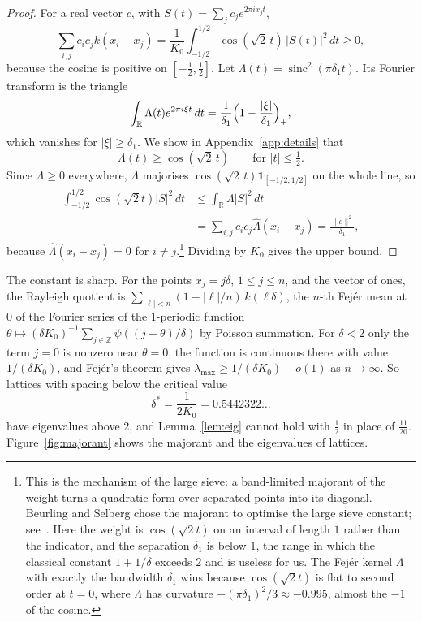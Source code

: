 \documentclass[aps,prd,twocolumn,superscriptaddress,nofootinbib,longbibliography,floatfix,showkeys,amsmath,amssymb,10pt]{revtex4-2}
\theoremstyle{definition}
\theoremstyle{remark}
\newcommand{\R}{\mathbb{R}}
\newcommand{\Z}{\mathbb{Z}}
\newcommand{\sinc}{\operatorname{sinc}}
\begin{document}
\begin{proof}
For a real vector $c$, with $S(t)=\sum_jc_je^{2\pi ix_jt}$,
\[
 \sum_{i,j}c_ic_jk(x_i-x_j)=\frac1{K_0}\int_{-1/2}^{1/2}\cos(\sqrt2\,t)
 \,|S(t)|^2\,dt\ge0,
\]
because the cosine is positive on $[-\frac12,\frac12]$. Let
$\Lambda(t)=\sinc^2(\pi\delta_1t)$. Its Fourier transform is the triangle
\[
 \int_\R\Lambda(t)e^{2\pi i\xi t}\,dt=\frac1{\delta_1}
 \Bigl(1-\frac{|\xi|}{\delta_1}\Bigr)_+,
\]
which vanishes for $|\xi|\ge\delta_1$. We show in Appendix~\ref{app:details}
that
\begin{equation}\label{eq:majorant}
 \Lambda(t)\ge\cos(\sqrt2\,t)\qquad\text{for }|t|\le\tfrac12 .
\end{equation}
Since $\Lambda\ge0$ everywhere, $\Lambda$ majorises
$\cos(\sqrt2\,t)\mathbf 1_{[-1/2,1/2]}$ on the whole line, so
\begin{align*}
 \int_{-1/2}^{1/2}\cos(\sqrt2t)|S|^2\,dt&\le\int_\R\Lambda|S|^2\,dt\\
 &=\sum_{i,j}c_ic_j\widehat\Lambda(x_i-x_j)=\frac{\|c\|^2}{\delta_1},
\end{align*}
because $\widehat\Lambda(x_i-x_j)=0$ for $i\ne j$.\footnote{This is the
mechanism of the large sieve: a band-limited majorant of the weight turns a
quadratic form over separated points into its diagonal. Beurling and Selberg
chose the majorant to optimise the large sieve constant;
see~\cite{Vaa85}. Here the weight is $\cos(\sqrt2t)$ on an interval of
length $1$ rather than the indicator, and the separation $\delta_1$ is below
$1$, the range in which the classical constant $1+1/\delta$ exceeds $2$ and
is useless for us. The Fej\'er kernel $\Lambda$ with exactly the bandwidth
$\delta_1$ wins because $\cos(\sqrt2t)$ is flat to second order at $t=0$,
where $\Lambda$ has curvature $-(\pi\delta_1)^2/3\approx-0.995$, almost the
$-1$ of the cosine.} Dividing by $K_0$ gives the upper bound.
\end{proof}

The constant is sharp. For the points $x_j=j\delta$, $1\le j\le n$, and the
vector of ones, the Rayleigh quotient is
$\sum_{|\ell|<n}(1-|\ell|/n)\,k(\ell\delta)$, the $n$-th Fej\'er mean at
$0$ of the Fourier series of the $1$-periodic function
$\theta\mapsto(\delta K_0)^{-1}\sum_{j\in\Z}\psi((j-\theta)/\delta)$ by
Poisson summation. For $\delta<2$ only the term $j=0$ is nonzero near
$\theta=0$, the function is continuous there with value $1/(\delta K_0)$, and
Fej\'er's theorem gives $\lambda_{\max}\ge1/(\delta K_0)-o(1)$ as
$n\to\infty$. So lattices with spacing below the critical value
\[
 \delta^*=\frac1{2K_0}=0.5442322\ldots
\]
have eigenvalues above $2$, and Lemma~\ref{lem:eig} cannot hold with
$\frac12$ in place of $\frac{11}{20}$. Figure~\ref{fig:majorant} shows the
majorant and the eigenvalues of lattices.
\end{document}
